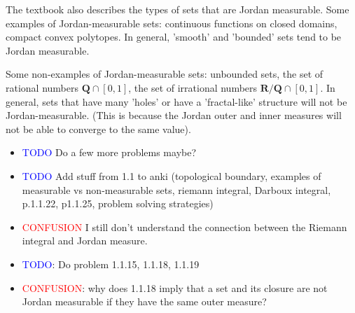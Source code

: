 \documentclass[answers,12pt]{exam}
\begin{document}
The textbook also describes the types of sets that are Jordan measurable.
Some examples of Jordan-measurable sets: continuous functions on closed domains, compact convex polytopes.
In general, 'smooth' and 'bounded' sets tend to be Jordan measurable.

Some non-examples of Jordan-measurable sets: unbounded sets, the set of rational numbers $\mathbf{Q} \cap [0,1]$, the set of irrational numbers $\mathbf{R/Q} \cap [0,1]$.
In general, sets that have many 'holes' or have a 'fractal-like' structure will not be Jordan-measurable.
(This is because the Jordan outer and inner measures will not be able to converge to the same value).

\begin{itemize}
    \item \textcolor{blue}{TODO} Do a few more problems maybe?
    \item \textcolor{blue}{TODO} Add stuff from 1.1 to anki (topological boundary, examples of measurable vs non-measurable sets, riemann integral, Darboux integral, p.1.1.22, p1.1.25, problem solving strategies)
    \item \textcolor{red}{CONFUSION} I still don't understand the connection between the Riemann integral and Jordan measure.
    \item \textcolor{blue}{TODO}: Do problem 1.1.15, 1.1.18, 1.1.19
    \item \textcolor{red}{CONFUSION}: why does 1.1.18 imply that a set and its closure are not Jordan measurable if they have the same outer measure?
\end{itemize}
\end{document}
